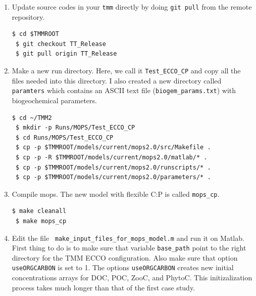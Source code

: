 \documentclass[a4paper]{article}
\begin{document}
\begin{enumerate}
\item{Update source codes in your \verb|tmm| directly by doing \verb|git pull| from the remote repository.}
\begin{lstlisting}[style=DOS]
 $ cd $TMMROOT
 $ git checkout TT_Release
 $ git pull origin TT_Release
\end{lstlisting}

\item Make a new run directory. Here, we call it \verb|Test_ECCO_CP| and copy all the files needed into this directory. I also created a new directory called \verb|paramters| which contains an ASCII text file (\verb|biogem_params.txt|) with biogeochemical parameters.
\begin{lstlisting}[style=DOS]
 $ cd ~/TMM2
 $ mkdir -p Runs/MOPS/Test_ECCO_CP
 $ cd Runs/MOPS/Test_ECCO_CP
 $ cp -p $TMMROOT/models/current/mops2.0/src/Makefile .
 $ cp -p -R $TMMROOT/models/current/mops2.0/matlab/* .
 $ cp -p $TMMROOT/models/current/mops2.0/runscripts/* .
 $ cp -p $TMMROOT/models/current/mops2.0/parameters/* .
\end{lstlisting}

\item Compile mops. The new model with flexible C:P is called \verb|mops_cp|. 
\begin{lstlisting}[style=DOS]
 $ make cleanall
 $ make mops_cp
\end{lstlisting}

\item Edit the file \ \verb/make_input_files_for_mops_model.m/ and run it on Matlab. First thing to do is to make sure that variable \verb/base_path/ point to the right directory for the TMM ECCO configuration. Also make sure that option \verb|useORGCARBON| is set to 1. The options \verb|useORGCARBON| creates new initial concentrations arrays for DOC, POC, ZooC, and PhytoC. This initizalization process takes much longer than that of the first case study.


\end{enumerate}
\end{document}
